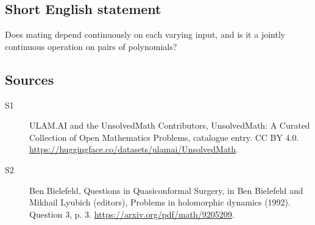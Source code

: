 \documentclass[11pt]{article}
\begin{document}
\subsection{Short English statement}
Does mating depend continuously on each varying input, and is it a jointly continuous operation on pairs of polynomials?
\subsection{Sources}
\begin{description}
\item[\hypertarget{source:statement:1}{S1}] ULAM.AI and the UnsolvedMath Contributors, UnsolvedMath: A Curated Collection of Open Mathematics Problems, catalogue entry. CC BY 4.0. \url{https://huggingface.co/datasets/ulamai/UnsolvedMath}.
\item[\hypertarget{source:statement:2}{S2}] Ben Bielefeld, Questions in Quasiconformal Surgery, in Ben Bielefeld and Mikhail Lyubich (editors), Problems in holomorphic dynamics (1992). Question 3, p. 3. \url{https://arxiv.org/pdf/math/9205209}.
\end{description}
\label{end:statement}
\end{document}
